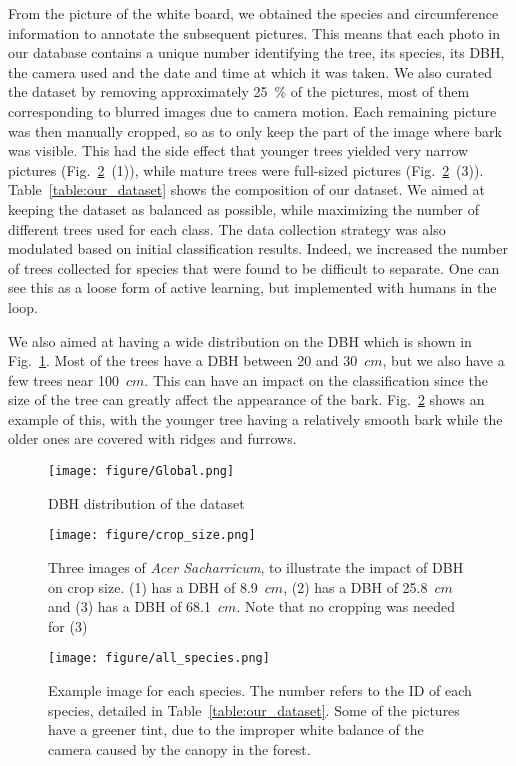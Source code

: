 \documentclass[letterpaper, 10 pt, conference]{ieeeconf}  %
\begin{document}
From the picture of the white board, we obtained the species and circumference information to annotate the subsequent pictures. This means that each photo in our database contains a unique number identifying the tree, its species, its DBH, the camera used and the date and time at which it was taken. We also curated the dataset by removing approximately 25~\% of the pictures, most of them corresponding to blurred images due to camera motion. Each remaining picture was then manually cropped, so as to only keep the part of the image where bark was visible. This had the side effect that younger trees yielded very narrow pictures (Fig.~\ref{fig:dbh}~(1)), while mature trees were full-sized pictures (Fig.~\ref{fig:dbh}~(3)). Table~\ref{table:our_dataset} shows the composition of our dataset. We aimed at keeping the dataset as balanced as possible, while maximizing the number of different trees used for each class. The data collection strategy was also modulated based on initial classification results. Indeed, we increased the number of trees collected for species that were found to be difficult to separate. One can see this as a loose form of active learning, but implemented with humans in the loop. 

We also aimed at having a wide distribution on the DBH which is shown in Fig.~\ref{DBH_distribution}. Most of the trees have a DBH between 20 and 30~$cm$, but we also have a few trees near 100~$cm$. This can have an impact on the classification since the size of the tree can greatly affect the appearance of the bark. Fig.~\ref{fig:dbh} shows an example of this, with the younger tree having a relatively smooth bark while the older ones are covered with ridges and furrows.

\begin{figure}[ht]
\centering
\texttt{[image: figure/Global.png]}
\caption{DBH distribution of the dataset}
\label{DBH_distribution}
\end{figure}

\begin{figure}[ht]
\centering
\texttt{[image: figure/crop\_size.png]}
\caption{Three images of \emph{Acer Sacharricum}, to illustrate the impact of DBH on crop size. (1) has a DBH of 8.9~$cm$, (2) has a DBH of 25.8~$cm$ and (3) has a DBH of 68.1~$cm$. Note that no cropping was needed for (3)}
\label{fig:dbh}
\end{figure}

\begin{figure*}[t]
\vspace*{3mm}
\centering
\texttt{[image: figure/all\_species.png]}
\caption{Example image for each species. The number refers to the ID of each species, detailed in Table~\ref{table:our_dataset}. Some of the pictures have a greener tint, due to the improper white balance of the camera caused by the canopy in the forest.}
\label{fig:all_species}
\end{figure*}
\end{document}
